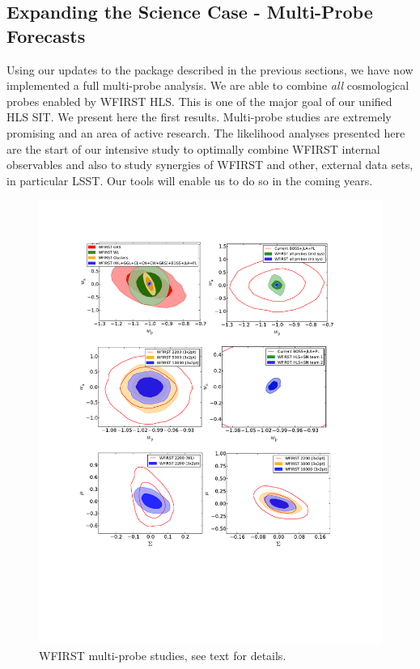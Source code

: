 \subsection{Expanding the Science Case - Multi-Probe Forecasts}

\begin{summaryii}
Using our updates to the \CoLi package described in the previous sections, we have now implemented a full multi-probe analysis. We are able to combine \emph{all} cosmological probes enabled by WFIRST HLS. This is one of the major goal of our unified HLS SIT. We present here the first results. Multi-probe studies are extremely promising and an area of active research. The likelihood analyses presented here are the start of our intensive study to optimally combine WFIRST internal observables and also to study synergies of WFIRST and other, external data sets, in particular LSST\@. Our tools will enable us to do so in the coming years.
\end{summaryii}


\label{sec:multi-probe}
\begin{figure}
\includegraphics[width=15cm]{Plots/forecasts/multi}
\caption{WFIRST multi-probe studies, see text for details.}
\label{fi:multi}
\end{figure}

